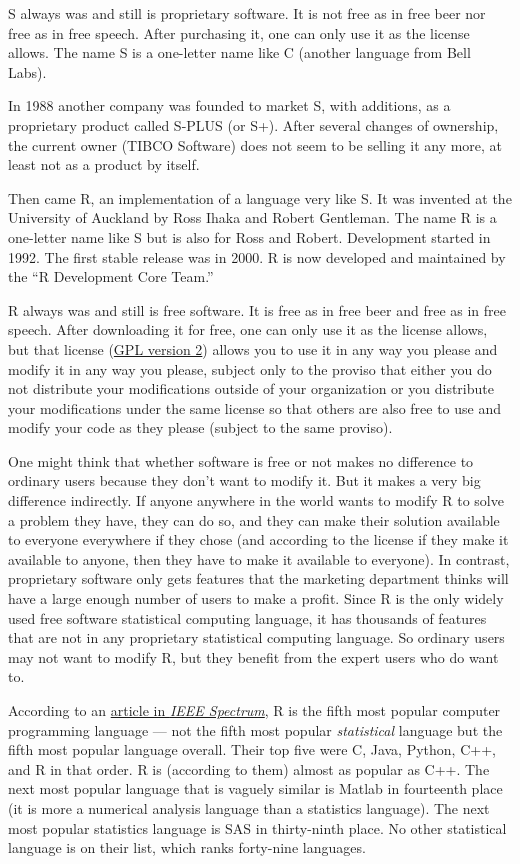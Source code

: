 \documentclass[
]{article}
\begin{document}
S always was and still is proprietary software. It is not free as in
free beer nor free as in free speech. After purchasing it, one can only
use it as the license allows. The name S is a one-letter name like C
(another language from Bell Labs).

In 1988 another company was founded to market S, with additions, as a
proprietary product called S-PLUS (or S+). After several changes of
ownership, the current owner (TIBCO Software) does not seem to be
selling it any more, at least not as a product by itself.

Then came R, an implementation of a language very like S. It was
invented at the University of Auckland by Ross Ihaka and Robert
Gentleman. The name R is a one-letter name like S but is also for Ross
and Robert. Development started in 1992. The first stable release was in
2000. R is now developed and maintained by the ``R Development Core
Team.''

R always was and still is free software. It is free as in free beer and
free as in free speech. After downloading it for free, one can only use
it as the license allows, but that license
(\href{https://en.wikipedia.org/wiki/GNU_General_Public_License}{GPL
version 2}) allows you to use it in any way you please and modify it in
any way you please, subject only to the proviso that either you do not
distribute your modifications outside of your organization or you
distribute your modifications under the same license so that others are
also free to use and modify your code as they please (subject to the
same proviso).

One might think that whether software is free or not makes no difference
to ordinary users because they don't want to modify it. But it makes a
very big difference indirectly. If anyone anywhere in the world wants to
modify R to solve a problem they have, they can do so, and they can make
their solution available to everyone everywhere if they chose (and
according to the license if they make it available to anyone, then they
have to make it available to everyone). In contrast, proprietary
software only gets features that the marketing department thinks will
have a large enough number of users to make a profit. Since R is the
only widely used free software statistical computing language, it has
thousands of features that are not in any proprietary statistical
computing language. So ordinary users may not want to modify R, but they
benefit from the expert users who do want to.

According to an
\href{http://spectrum.ieee.org/static/interactive-the-top-programming-languages-2016}{article
in \emph{IEEE Spectrum}}, R is the fifth most popular computer
programming language --- not the fifth most popular \emph{statistical}
language but the fifth most popular language overall. Their top five
were C, Java, Python, C++, and R in that order. R is (according to them)
almost as popular as C++. The next most popular language that is vaguely
similar is Matlab in fourteenth place (it is more a numerical analysis
language than a statistics language). The next most popular statistics
language is SAS in thirty-ninth place. No other statistical language is
on their list, which ranks forty-nine languages.
\end{document}

